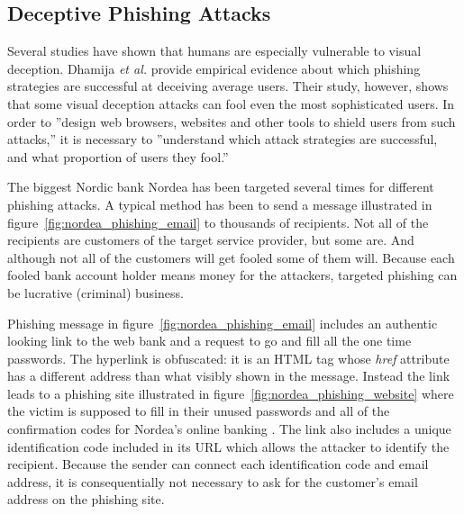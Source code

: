 \documentclass[english,gradu]{tktltiki}
\begin{document}

\subsection{Deceptive Phishing Attacks} %
\label{sub:deceptive_phishing_attacks}

             \label{sec:visual_deception}

              Several studies have shown \cite{visual_similarity_phishing_2008, why_phishing_works_06, suspectibility_to_phishing_2006} that humans are especially vulnerable to visual deception. Dhamija \emph{et al.} \cite{why_phishing_works_06} provide empirical evidence about which phishing strategies are successful at deceiving average users. Their study, however, shows that some visual deception attacks can fool even the most sophisticated users. In order to ''design web browsers, websites and other tools to shield users from such attacks,'' it is necessary to ''understand which attack strategies are successful, and what proportion of users they fool.'' \cite{why_phishing_works_06}

              The biggest Nordic bank Nordea has been targeted several times for different phishing attacks. A typical method has been to send a message illustrated in figure~\ref{fig:nordea_phishing_email} to thousands of recipients. Not all of the recipients are customers of the target service provider, but some are. And although not all of the customers will get fooled some of them will. Because each fooled bank account holder means money for the attackers, targeted phishing can be lucrative (criminal) business.

                Phishing message in figure~\ref{fig:nordea_phishing_email} includes an authentic looking link to the web bank and a request to go and fill all the one time passwords. The hyperlink is obfuscated: it is an HTML tag whose \emph{href} attribute has a different address than what visibly shown in the message. Instead the link leads to a phishing site illustrated in figure~\ref{fig:nordea_phishing_website} where the victim is supposed to fill in their unused passwords and all of the confirmation codes for Nordea's online banking \cite{nordea_fsecure_2006, nordea_miller_2006}. The link also includes a unique identification code included in its URL which allows the attacker to identify the recipient. Because the sender can connect each identification code and email address, it is consequentially not necessary to ask for the customer's email address on the phishing site.
\end{document}
